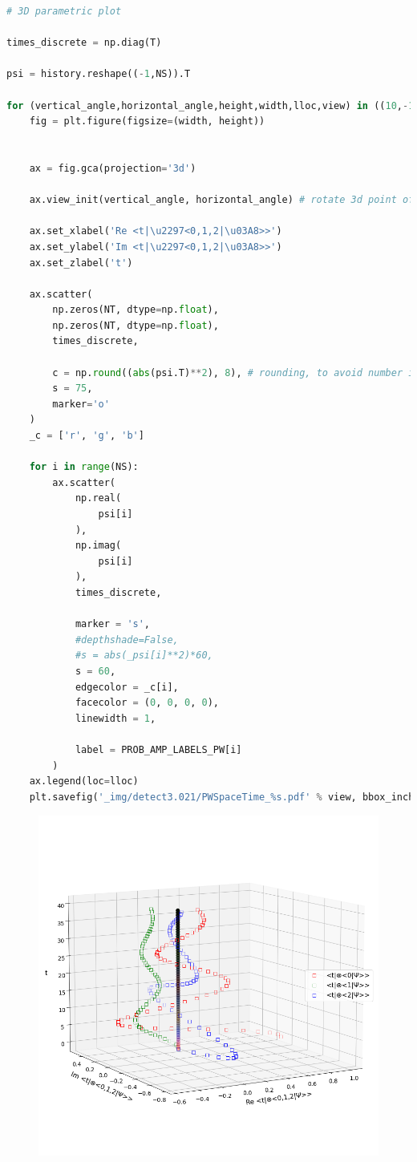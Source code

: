 \begin{lstlisting}[language=Python]
# 3D parametric plot

times_discrete = np.diag(T)

psi = history.reshape((-1,NS)).T

for (vertical_angle,horizontal_angle,height,width,lloc,view) in ((10,-120,15,25,'center right','side'), (80,-100,15,25,'center right','top')):
    fig = plt.figure(figsize=(width, height))


    ax = fig.gca(projection='3d')

    ax.view_init(vertical_angle, horizontal_angle) # rotate 3d point of view

    ax.set_xlabel('Re <t|\u2297<0,1,2|\u03A8>>')
    ax.set_ylabel('Im <t|\u2297<0,1,2|\u03A8>>')
    ax.set_zlabel('t')
    
    ax.scatter(
        np.zeros(NT, dtype=np.float),
        np.zeros(NT, dtype=np.float),
        times_discrete,
    
        c = np.round((abs(psi.T)**2), 8), # rounding, to avoid number instability causing out-of-range rgb vals
        s = 75,
        marker='o'
    )
    _c = ['r', 'g', 'b']

    for i in range(NS):
        ax.scatter(
            np.real(
                psi[i]
            ),
            np.imag(
                psi[i]
            ),
            times_discrete,

            marker = 's',
            #depthshade=False,
            #s = abs(_psi[i]**2)*60,
            s = 60,
            edgecolor = _c[i],
            facecolor = (0, 0, 0, 0),
            linewidth = 1,

            label = PROB_AMP_LABELS_PW[i]
        )
    ax.legend(loc=lloc)
    plt.savefig('_img/detect3.021/PWSpaceTime_%s.pdf' % view, bbox_inches='tight', pad_inches=0)
\end{lstlisting}

\begin{figure}[h!]
\centering
\includegraphics[width=0.66\linewidth]{tex/appendix/nb/jupyter/3lev/output_64_0.png}

\end{figure}

